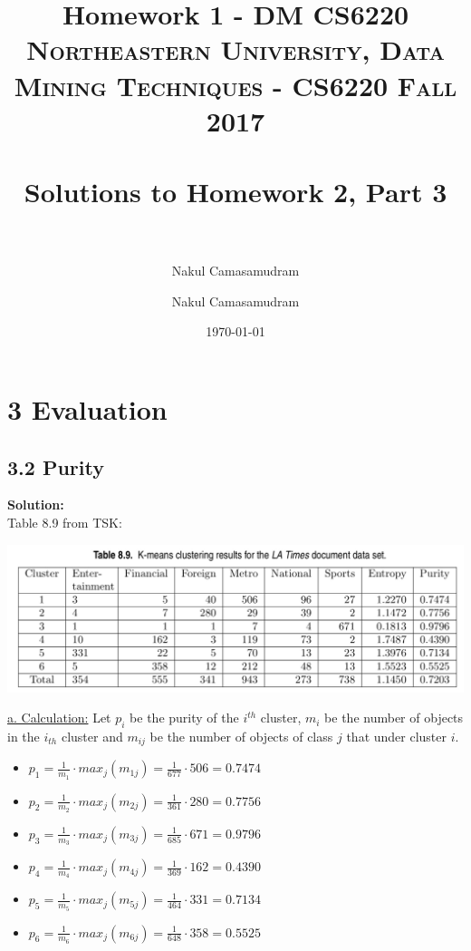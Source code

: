 \documentclass[11pt]{article}
\title{Homework 1 - DM CS6220}
\author{Nakul Camasamudram}
\title{	
	\normalfont \normalsize 
	\textsc{Northeastern University, Data Mining Techniques - CS6220 Fall 2017} \\
	\horrule{0.5pt} \\[0.4cm] %
	\huge Solutions to Homework 2, Part 3 \\ %
	\horrule{2pt} \\[0.5cm] %
	}
\author{Nakul Camasamudram} %
\date{\normalsize\today} %
\begin{document}
	
	\maketitle %
	\newpage
	
	
\section*{3 Evaluation}

\subsection*{3.2 Purity}
\textbf{Solution:}\\

Table 8.9 from TSK: \\
\begin{center}
	\includegraphics[scale=0.2]{table_8_9.jpeg}
\end{center}

\underline{a. Calculation:}
Let $p_i$ be the purity of the $i^{th}$ cluster, $m_i$ be the number of objects in the $i_{th}$ cluster and $m_{ij}$ be the number of objects of class $j$ that under cluster $i$.

\begin{itemize}
	\item $p_1 = \frac{1}{m_1} \cdot max_{j}(m_{1j}) = \frac{1}{677} \cdot 506 = 0.7474$
	\item $p_2 = \frac{1}{m_2} \cdot max_{j}(m_{2j}) = \frac{1}{361} \cdot 280 = 0.7756$
	\item $p_3 = \frac{1}{m_3} \cdot max_{j}(m_{3j}) = \frac{1}{685} \cdot 671 = 0.9796$
	\item $p_4 = \frac{1}{m_4} \cdot max_{j}(m_{4j}) = \frac{1}{369} \cdot 162 = 0.4390$
	\item $p_5 = \frac{1}{m_5} \cdot max_{j}(m_{5j}) = \frac{1}{464} \cdot 331 = 0.7134$
	\item $p_6 = \frac{1}{m_6} \cdot max_{j}(m_{6j}) = \frac{1}{648} \cdot 358 = 0.5525$
\end{itemize}	
\end{document}
